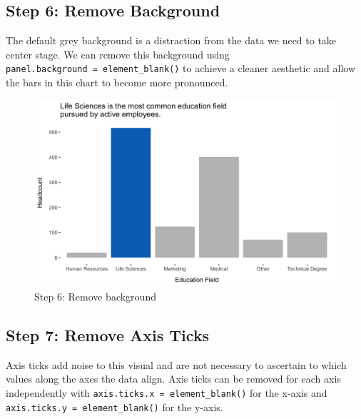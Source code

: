 \documentclass[
]{book}
\begin{document}
\hypertarget{step-6-remove-background}{%
\subsection{Step 6: Remove Background}\label{step-6-remove-background}}

The default grey background is a distraction from the data we need to take center stage. We can remove this background using \texttt{panel.background\ =\ element\_blank()} to achieve a cleaner aesthetic and allow the bars in this chart to become more pronounced.

\begin{figure}

{\centering \includegraphics[width=1\linewidth]{graphics/viz_step_6} 

}

\caption{Step 6: Remove background}\label{fig:barchart-6}
\end{figure}

\hypertarget{step-7-remove-axis-ticks}{%
\subsection{Step 7: Remove Axis Ticks}\label{step-7-remove-axis-ticks}}

Axis ticks add noise to this visual and are not necessary to ascertain to which values along the axes the data align. Axis ticks can be removed for each axis independently with \texttt{axis.ticks.x\ =\ element\_blank()} for the x-axis and \texttt{axis.ticks.y\ =\ element\_blank()} for the y-axis.
\end{document}
